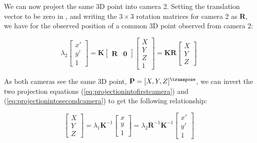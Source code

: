 We can now project the same 3D point into camera 2. Setting the translation vector to be zero in \eqn{\ref{eq:combinedexpandedsmaller}}, and writing the $3\times3$ rotation matrices for camera 2 as $\mathbf{R}$, we have for the observed position of a common 3D point observed from camera 2:


\begin{equation}
     \lambda_2 
    \begin{bmatrix}
    x' \\
    y' \\
    1
    \end{bmatrix}
    =
    \mathbf{K} 
    \begin{bmatrix}
    \mathbf{R} & \mathbf{0} 
    \end{bmatrix}
    \begin{bmatrix}
    X \\
    Y \\
    Z \\
    1
    \end{bmatrix}
    = 
    \mathbf{K}  \mathbf{R} 
    \begin{bmatrix}
    X \\
    Y \\
    Z
    \end{bmatrix}
    \label{eq:projectionintosecondcamera}
\end{equation}

As both cameras see the same 3D point, $\mathbf{P}=[X,Y,Z]^\transpose$, we can invert the two projection equations (\ref{eq:projectionintofirstcamera}) and (\ref{eq:projectionintosecondcamera}) to get the following relationship:


\begin{equation}
    \begin{bmatrix}
    X \\
    Y \\
    Z
    \end{bmatrix}
    = 
    \lambda_1 \mathbf{K}^{-1}
    \begin{bmatrix}
    x \\
    y \\
    1
    \end{bmatrix}
    =
    \lambda_2 \mathbf{R}^{-1} \mathbf{K}^{-1}
    \begin{bmatrix}
    x' \\
    y' \\
    1
    \end{bmatrix}
    \label{eq:inverted_projectionintofirstcamera}
\end{equation}

